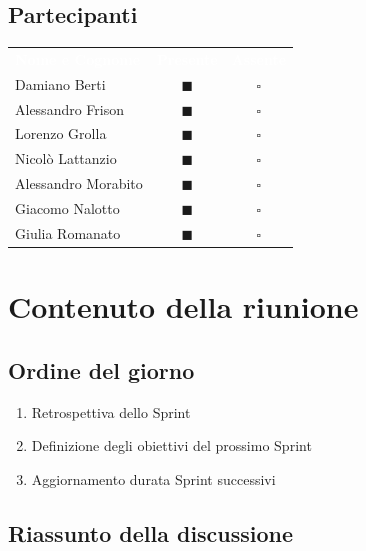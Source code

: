 \documentclass[a4paper, 11pt]{article}
\begin{document}
\subsection{Partecipanti}
\begin{center}
    \begin{tabular}{>{\raggedright\arraybackslash}p{6cm} c c}
        \rowcolor{AccentColor}
        \textcolor{white}{\textbf{Nome e Cognome}} & 
        \textcolor{white}{\textbf{Presente}} & 
        \textcolor{white}{\textbf{Assente}} \\
        
        Damiano Berti     & \textcolor{AccentColor}{$\blacksquare$}    & $\square$        \\
        Alessandro Frison     & \textcolor{AccentColor}{$\blacksquare$}    & $\square$        \\
        Lorenzo Grolla     & \textcolor{AccentColor}{$\blacksquare$}    & $\square$        \\
        Nicolò Lattanzio    & \textcolor{AccentColor}{$\blacksquare$}    & $\square$        \\
        Alessandro Morabito   & \textcolor{AccentColor}{$\blacksquare$}    & $\square$        \\
        Giacomo Nalotto   & \textcolor{AccentColor}{$\blacksquare$}    & $\square$        \\
        Giulia Romanato   & \textcolor{AccentColor}{$\blacksquare$}    & $\square$        \\
    \end{tabular}
\end{center}

\section{Contenuto della riunione}
\subsection{Ordine del giorno}
\begin{enumerate}
    \item Retrospettiva dello Sprint
    \item Definizione degli obiettivi del prossimo Sprint
    \item Aggiornamento durata Sprint successivi
\end{enumerate}
\newpage
\subsection{Riassunto della discussione}
\end{document}
